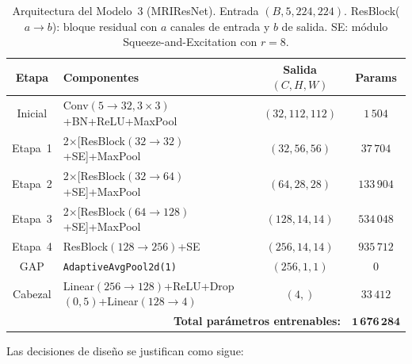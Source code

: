 \begin{table}[!t]
\centering
\caption{Arquitectura del Modelo~3 (MRIResNet). Entrada
$(B,5,224,224)$. ResBlock($a{\to}b$): bloque residual con $a$
canales de entrada y $b$ de salida. SE: módulo
Squeeze-and-Excitation con $r{=}8$.}
\label{tab:arq-m3}
\renewcommand{\arraystretch}{1.2}
\setlength{\tabcolsep}{6pt}
\footnotesize
\begin{tabular}{@{}clcc@{}}
\toprule
\textbf{Etapa} & \textbf{Componentes} &
\textbf{Salida $(C,H,W)$} & \textbf{Params} \\
\midrule
Inicial &
  Conv$(5{\to}32,3{\times}3)$+BN+ReLU+MaxPool &
  $(32,112,112)$ & $1\,504$ \\
Etapa~1 &
  2$\times$[ResBlock$(32{\to}32)$+SE]+MaxPool &
  $(32,56,56)$ & $37\,704$ \\
Etapa~2 &
  2$\times$[ResBlock$(32{\to}64)$+SE]+MaxPool &
  $(64,28,28)$ & $133\,904$ \\
Etapa~3 &
  2$\times$[ResBlock$(64{\to}128)$+SE]+MaxPool &
  $(128,14,14)$ & $534\,048$ \\
Etapa~4 &
  ResBlock$(128{\to}256)$+SE &
  $(256,14,14)$ & $935\,712$ \\
GAP &
  \texttt{AdaptiveAvgPool2d(1)} &
  $(256,1,1)$ & $0$ \\
Cabezal &
  Linear$(256{\to}128)$+ReLU+Drop$(0{,}5)$+Linear$(128{\to}4)$ &
  $(4,)$ & $33\,412$ \\
\midrule
\multicolumn{3}{r}{\textbf{Total parámetros entrenables:}} &
  $\mathbf{1\,676\,284}$ \\
\bottomrule
\end{tabular}
\end{table}

Las decisiones de diseño se justifican como sigue:

